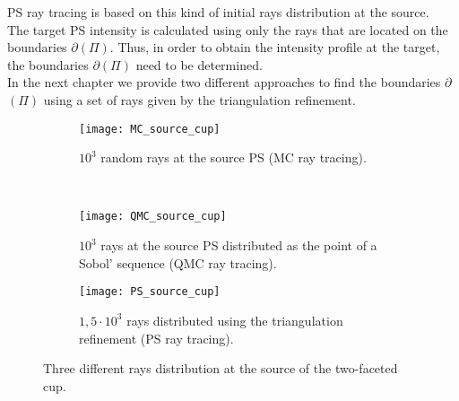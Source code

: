 PS ray tracing is based on this kind of initial rays distribution at the source.
\\ \indent The target PS intensity is calculated using only the rays that are located on the boundaries $\partial$$(\Pi)$. Thus, in order to obtain the intensity profile at the target, the boundaries $\partial$$(\Pi)$ need to be determined.\\ \indent 
In the next chapter we provide two different approaches to find the boundaries $\partial$$(\Pi)$ using a set of rays given by the triangulation refinement.
\begin{figure}[h]
 \begin{subfigure}[t]{\textwidth}
\centering
    \texttt{[image: MC\_source\_cup]}
    \caption{$10^3$ random rays at the source PS (MC ray tracing).}
    \label{fig:mc_sample}
\end{subfigure}
\hfill
\\
\begin{subfigure}[t]{\textwidth}
\centering
    \texttt{[image: QMC\_source\_cup]}
    \caption{$10^3$ rays at the source PS distributed as the point of a Sobol' sequence (QMC ray tracing).}
    \label{fig:qmc_sample}
\end{subfigure}
\hfill
\begin{subfigure}[t]{\textwidth}
\centering
\texttt{[image: PS\_source\_cup]}
\caption{$1,5\cdot10^3$ rays distributed using the triangulation refinement (PS ray tracing).}
\label{fig:ps_sample}
\end{subfigure}
\caption{Three different rays distribution at the source of the two-faceted cup.}
\label{fig:three_distributions}
\end{figure}


